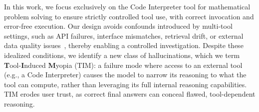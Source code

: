 \documentclass[11pt]{article}
\def \task{\textsc{TIM}\xspace}
\newcommand{\pouya}[1]{{\color{violet}Pouya: #1}}
\begin{document}



In this work, we focus exclusively on the Code Interpreter tool for mathematical problem solving to ensure strictly controlled tool use, with correct invocation and error-free execution. Our design avoids confounds introduced by multi-tool settings, such as API failures, interface mismatches, retrieval drift, or external data quality issues~\citep{zhong2025complexfuncbench, faghih2025tool, maekawa2025towards, han2025search}, thereby enabling a controlled investigation. Despite these idealized conditions, we identify a new class of hallucinations, which we term \textbf{T}ool-\textbf{I}nduced \textbf{M}yopia (\task): a failure mode where access to an external tool (e.g., a Code Interpreter) causes the model to narrow its reasoning to what the tool can compute, rather than leveraging its full internal reasoning capabilities. \task{} erodes user trust, as correct final answers can conceal flawed, tool-dependent reasoning.
\end{document}
